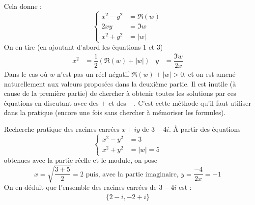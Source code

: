 Cela donne :
\begin{equation*}
 \left\lbrace 
\begin{aligned}
 x^2 - y^2 &= \Re(w) \\
2xy &= \Im w \\
x^2 + y^2 &= |w|
\end{aligned}
\right. 
\end{equation*}
On en tire (en ajoutant d'abord les équations 1 et 3)
\begin{align}
 x^2 &= \dfrac{1}{2}(\Re(w) + |w|)& y&= \dfrac{\Im w}{2x}
\end{align}
Dans le cas où $w$ n'est pas un réel négatif $\Re(w) + |w| >0$, et on est amené naturellement aux valeurs proposées dans la deuxième partie. Il est inutile (à cause de la première partie) de chercher à obtenir toutes les solutions par ces équations en discutant avec des $+$ et des $-$. C'est cette méthode qu'il faut utiliser dans la pratique (encore une fois sans chercher à mémoriser les formules).
\begin{exple}
 Recherche pratique des racines carrées $x+iy$ de $3-4i$. \`A partir des équations
\begin{equation*}
 \left\lbrace 
\begin{aligned}
 x^2 - y^2 &=  3\\
x^2 + y^2 &= |w| = 5
\end{aligned}
\right. 
\end{equation*}
obtenues avec la partie réelle et le module, on pose
\begin{displaymath}
 x= \sqrt{\dfrac{3+5}{2}} = 2
\text{  puis, avec la partie imaginaire, }
 y = \frac{-4}{2x}= - 1
\end{displaymath}
On en déduit que l'ensemble des racines carrées de $3-4i$ est :
\begin{align*}
 \{2-i, -2+i\}
\end{align*}
\end{exple}
